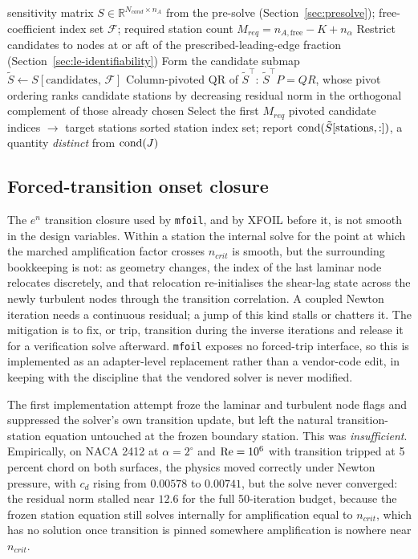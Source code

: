 \begin{algorithm}
\caption{QR-pivoted target-station selection}
\label{alg:qrpivot}
\begin{algorithmic}[1]
\Require sensitivity matrix $S\in\mathbb{R}^{N_{cand}\times n_A}$ from the pre-solve (Section~\ref{sec:presolve}); free-coefficient index set $\mathcal{F}$; required station count $M_{req} = n_{A,\text{free}} - K + n_\alpha$
\State Restrict candidates to nodes at or aft of the prescribed-leading-edge fraction (Section~\ref{sec:le-identifiability})
\State Form the candidate submap $\tilde S \gets S[\text{candidates},\, \mathcal{F}]$
\State Column-pivoted QR of $\tilde S^\top$: $\tilde S^\top P = QR$, whose pivot ordering ranks candidate stations by decreasing residual norm in the orthogonal complement of those already chosen
\State Select the first $M_{req}$ pivoted candidate indices $\rightarrow$ target stations
\State \Return sorted station index set; report $\operatorname{cond}(\tilde S[\text{stations},:])$, a quantity \emph{distinct} from $\operatorname{cond}(J)$
\end{algorithmic}
\end{algorithm}

\subsection{Forced-transition onset closure}
\label{sec:transition}

The $e^n$ transition closure used by \texttt{mfoil}, and by XFOIL before it,
is not smooth in the design variables. Within a station the internal solve for
the point at which the marched amplification factor crosses $n_{crit}$ is
smooth, but the surrounding bookkeeping is not: as geometry changes, the index
of the last laminar node relocates discretely, and that relocation
re-initialises the shear-lag state across the newly turbulent nodes through
the transition correlation. A coupled Newton iteration needs a continuous
residual; a jump of this kind stalls or chatters it. The mitigation is to fix,
or trip, transition during the inverse iterations and release it for a
verification solve afterward. \texttt{mfoil} exposes no forced-trip interface,
so this is implemented as an adapter-level replacement rather than a
vendor-code edit, in keeping with the discipline that the vendored solver is
never modified.

The first implementation attempt froze the laminar and turbulent node flags
and suppressed the solver's own transition update, but left the natural
transition-station equation untouched at the frozen boundary station. This was
\emph{insufficient}. Empirically, on NACA 2412 at $\alpha=2^\circ$ and
$\mathrm{Re}=10^6$ with transition tripped at 5 percent chord on both surfaces, the
physics moved correctly under Newton pressure, with $c_d$ rising from
$0.00578$ to $0.00741$, but the solve never converged: the residual norm
stalled near $12.6$ for the full 50-iteration budget, because the frozen
station equation still solves internally for amplification equal to $n_{crit}$,
which has no solution once transition is pinned somewhere amplification is
nowhere near $n_{crit}$.

